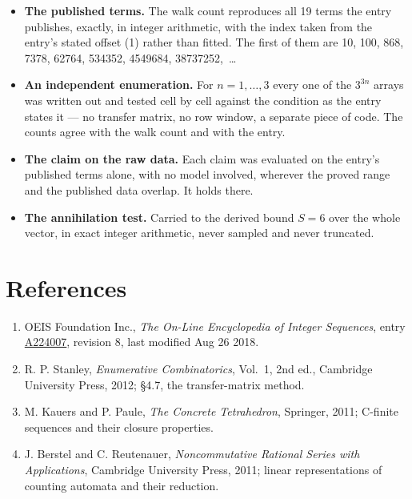 \documentclass[11pt]{article}
\theoremstyle{definition}
\begin{document}
\begin{itemize}

\item {\bfseries The published terms.} The walk count reproduces all 19 terms the entry publishes, exactly, in integer arithmetic, with the index taken from the entry's stated offset (1) rather than fitted. The first of them are 10, 100, 868, 7378, 62764, 534352, 4549684, 38737252,~\dots

\item {\bfseries An independent enumeration.} For $n = 1,\dots,3$ every one of the $3^{3n}$ arrays was written out and tested cell by cell against the condition as the entry states it --- no transfer matrix, no row window, a separate piece of code. The counts agree with the walk count and with the entry.

\item {\bfseries The claim on the raw data.} Each claim was evaluated on the entry's published terms alone, with no model involved, wherever the proved range and the published data overlap. It holds there.

\item {\bfseries The annihilation test.} Carried to the derived bound $S = 6$ over the whole vector, in exact integer arithmetic, never sampled and never truncated.

\end{itemize}

\section{References}

\begin{enumerate}

\item OEIS Foundation Inc., \emph{The On-Line Encyclopedia of Integer Sequences}, entry \href{https://oeis.org/A224007}{A224007}, revision 8, last modified Aug 26 2018.

\item R. P. Stanley, \emph{Enumerative Combinatorics}, Vol.~1, 2nd ed., Cambridge University Press, 2012; \S4.7, the transfer-matrix method.

\item M. Kauers and P. Paule, \emph{The Concrete Tetrahedron}, Springer, 2011; C-finite sequences and their closure properties.

\item J. Berstel and C. Reutenauer, \emph{Noncommutative Rational Series with Applications}, Cambridge University Press, 2011; linear representations of counting automata and their reduction.

\end{enumerate}
\end{document}
